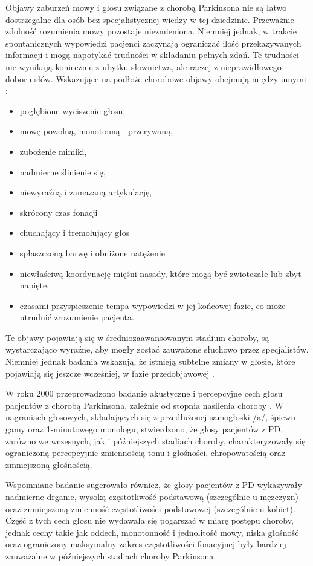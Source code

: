 Objawy zaburzeń mowy i głosu związane z chorobą Parkinsona nie są łatwo dostrzegalne dla osób bez specjalistycznej wiedzy w tej dziedzinie.
Przeważnie zdolność rozumienia mowy pozostaje niezmieniona.
Niemniej jednak, w trakcie spontanicznych wypowiedzi pacjenci zaczynają ograniczać ilość przekazywanych informacji i mogą napotykać trudności w składaniu
pełnych zdań.
Te trudności nie wynikają koniecznie z ubytku słownictwa, ale raczej z nieprawidłowego doboru słów.
Wskazujące na podłoże chorobowe objawy obejmują między innymi \cite{Szurek_2018, Kuryłowicz_2019}:
\begin{itemize}[itemsep=0.1pt]
	\item pogłębione wyciszenie głosu,
	\item mowę powolną, monotonną i przerywaną,
	\item zubożenie mimiki,
	\item nadmierne ślinienie się,
	\item niewyraźną i zamazaną artykulację,
	\item skrócony czas fonacji
	\item chuchający i tremolujący głos
	\item spłaszczoną barwę i obniżone natężenie
	\item niewłaściwą koordynację mięśni nasady, które mogą być zwiotczałe lub zbyt napięte,
	\item czasami przyspieszenie tempa wypowiedzi w jej końcowej fazie, co może utrudnić zrozumienie pacjenta.
\end{itemize}

Te objawy pojawiają się w średniozaawansowanym stadium choroby, są wystarczająco wyraźne, aby mogły zostać zauważone słuchowo przez specjalistów.
Niemniej jednak badania wskazują, że istnieją subtelne zmiany w głosie, które pojawiają się jeszcze wcześniej, w fazie przedobjawowej \cite{2023_PD_voice}.

W roku 2000 przeprowadzono badanie akustyczne i percepcyjne cech głosu pacjentów z chorobą Parkinsona, zależnie od stopnia nasilenia choroby \cite{https://doi.org/10.1080/136828200410654}.
W nagraniach głosowych, składających się z przedłużonej samogłoski /a/, śpiewu gamy oraz 1-minutowego monologu, stwierdzono, że głosy pacjentów z PD,
zarówno we wczesnych, jak i późniejszych stadiach choroby, charakteryzowały się ograniczoną percepcyjnie zmiennością tonu i głośności, chropowatością
oraz zmniejszoną głośnością.

Wspomniane badanie sugerowało również, że głosy pacjentów z PD wykazywały nadmierne drganie, wysoką częstotliwość podstawową (szczególnie u mężczyzn) oraz zmniejszoną zmienność częstotliwości podstawowej (szczególnie u kobiet).
Część z tych cech głosu nie wydawała się pogarszać w miarę postępu choroby, jednak cechy takie jak oddech, monotonność i jednolitość mowy, niska głośność oraz ograniczony maksymalny zakres częstotliwości fonacyjnej były bardziej zauważalne w późniejszych stadiach choroby Parkinsona.


